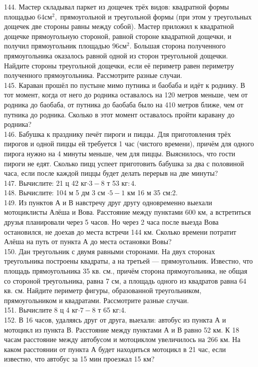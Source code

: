 \documentclass[12pt]{article}
\begin{document}
144. Мастер складывал паркет из дощечек трёх видов: квадратной формы площадью $64\text{см}^2,$ прямоугольной и треугольной формы (при этом у треугольных дощечек две стороны равны между собой). Мастер приложил к квадратной дощечке прямоугольную стороной, равной стороне квадратной дощечки, и получил прямоугольник площадью $96\text{см}^2.$ Большая сторона полученного прямоугольника оказалось равной одной из сторон треугольной дощечки. Найдите стороны треугольной дощечки, если её периметр равен периметру полученного прямоугольника. Рассмотрите разные случаи.\\
145. Караван прошёл по пустыне мимо путника и баобаба и идёт к роднику. В тот момент, когда от него до родника оставалось на 120 метров меньше, чем от родника до баобаба, от путника до баобаба было на 410 метров ближе, чем от путника до родника. Сколько в этот момент оставалось пройти каравану до родника?\\
146. Бабушка к празднику печёт пироги и пиццы. Для приготовления трёх пирогов и одной пиццы ей требуется 1 час (чистого времени), причём для одного пирога нужно на 4 минуты меньше, чем для пиццы. Выяснилось, что гости пироги не едят. Сколько пицц успеет приготовить бабушка за два с половиной часа, если после каждой пиццы будет делать перерыв на две минуты?\\
147. Вычислите: 21 ц 42 кг$\cdot3-8$ т 53 кг$:4.$\\
148. Вычислите: 104 м 5 дм 3 см $\cdot 5-1$ км 16 м 35 см:2.\\
149. Из пунктов А и В навстречу друг другу одновременно выехали мотоциклисты Алёша и Вова. Расстояние между пунктами 600 км, а встретиться друзья планировали через 5 часов. Но через 2 часа после выезда Вова остановился, не доехав до места встречи 144 км. Сколько времени потратит Алёша на путь от пункта А до места остановки Вовы?\\
150. Дан треугольник с двумя равными сторонами. На двух сторонах треугольника построены квадраты, а на третьей --- прямоугольник. Известно, что площадь прямоугольника 35 кв. см., причём сторона прямоугольника, не общая со стороной треугольника, равна 7 см, а площадь одного из квадратов равна 64 кв. см. Найдите периметр фигуры, образованной треугольником, прямоугольником и квадратами. Рассмотрите разные случаи.\\
151. Вычислите 8 ц 4 кг$\cdot7-8$ т 65 кг:4.\\
152. В 16 часов, удаляясь друг от друга, выехали: автобус из пункта А и мотоцикл из пункта В. Расстояние между пунктами А и В равно 52 км. К 18 часам расстояние между автобусом и мотоциклом увеличилось на 266 км. На каком расстоянии от пункта А будет находиться мотоцикл в 21 час, если известно, что автобус за 15 мин проезжал 15 км?\\
\end{document}
